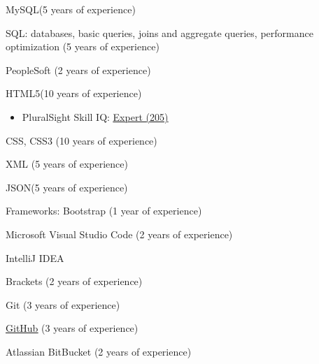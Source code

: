 \documentclass[]{deedy-resume-openfont}
\begin{document}
\descript{}
\begin{tightemize}
\item MySQL\footnotemark[\value{footnote}] (5 years of experience)
\item SQL: databases, basic queries, joins and aggregate queries, performance optimization (5 years of experience)
\item PeopleSoft (2 years of experience)
\end{tightemize}
\sectionsep

\descript{}
\begin{tightemize}
\item HTML5\footnotemark[\value{footnote}] (10 years of experience)
\begin{itemize}
\item PluralSight Skill IQ: \href{https://app.pluralsight.com/profile/alexander-koik-cesto}{\underline{Expert (205)}}
\end{itemize}
\item CSS\footnotemark[\value{footnote}], CSS3 (10 years of experience)
\item XML (5 years of experience)
\item JSON\footnotemark[\value{footnote}] (5 years of experience)
\item Frameworks: Bootstrap (1 year of experience)
\end{tightemize}
\sectionsep

\descript{}
\begin{tightemize}
\item Microsoft Visual Studio Code (2 years of experience)
\item IntelliJ IDEA
\item Brackets (2 years of experience)
\end{tightemize}
\sectionsep

\descript{}
\begin{tightemize}
\item Git (3 years of experience)
\item \href{https://github.com/sirkoik}{\underline{GitHub}} (3 years of experience)
\item Atlassian BitBucket (2 years of experience)
\end{tightemize}
\sectionsep


\newpage
\end{document}
